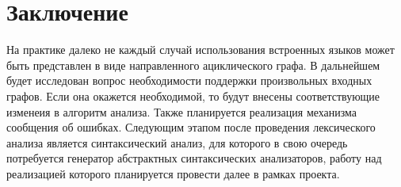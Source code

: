 




\section*{Заключение}

На практике далеко не каждый случай использования встроенных языков может быть 
представлен в виде направленного ациклического графа.  В дальнейшем будет
исследован вопрос необходимости поддержки произвольных входных графов. Если
она окажется необходимой, то будут  внесены соответствующие изменеия в алгоритм
анализа. Также планируется реализация механизма сообщения об ошибках. Следующим 
этапом после проведения лексического 
анализа является синтаксический анализ, для которого в свою очередь потребуется 
генератор абстрактных синтаксических анализаторов, работу над реализацией 
которого планируется провести далее в рамках проекта. 

